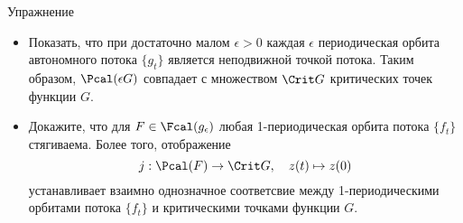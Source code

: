 \begin{ex}{Упражнение}\label{13.3.D}
  \begin{itemize}
  \item
    Показать, что при достаточно малом $\epsilon > 0$ каждая
    $\epsilon$ периодическая орбита автономного потока $\{g_{t}\}$
    является неподвижной точкой потока. Таким образом, $\Pcal(\epsilon
    G)$ совпадает с множеством $\Crit G$ критических точек функции $G$.
  \item
    Докажите, что для $F\in\Fcal(g_{\epsilon})$ любая 1-периодическая
    орбита потока $\{f_{t}\}$ стягиваема. 
    Более того, отображение
    \[
    j : \Pcal(F)\to\Crit G,
    \quad
    z(t)\mapsto z(0)
    \]
    устанавливает взаимно однозначное соответсвие между
    1-пе\-ри\-оди\-чес\-ки\-ми орбитами потока $\{f_{t}\}$ и критическими
    точками функции $G$.
  \end{itemize}
\end{ex}
